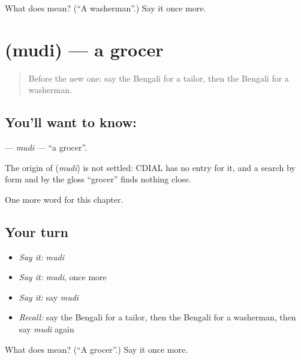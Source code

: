 \begin{tcolorbox}[breakable,colback=teal!4,colframe=teal!35!black,title={Before you move on}]
What does  mean? (\textquotedblleft{}A washerman\textquotedblright{}.) Say it once more.
\end{tcolorbox}
\section[\texorpdfstring{\bn{মুদি} (mudi)}{মুদি (mudi)}]{ (mudi) — a grocer}

\label{lesson:BN-C126-mudi}



\begin{quote}
Before the new one: say the Bengali for a tailor, then the Bengali for a washerman.
\end{quote}

\subsection*{You'll want to know: }
\textbf{} — \emph{mudi} — \textquotedblleft{}a grocer\textquotedblright{}.

\begin{cousinweb}
The origin of \textbf{} (\emph{mudi}) is not settled: CDIAL has no entry for it, and a search by form and by the gloss \textquotedblleft{}grocer\textquotedblright{} finds nothing close.
\end{cousinweb}

\begin{grammarlens}[title={What you've built}]
One more word for this chapter.
\end{grammarlens}

\subsection*{Your turn}
\begin{itemize}
\raggedright
  \item \emph{Say it:} \emph{mudi}
  \item \emph{Say it:} \emph{mudi}, once more
  \item \emph{Say it:} say \emph{mudi}
  \item \emph{Recall:} say the Bengali for a tailor, then the Bengali for a washerman, then say \emph{mudi} again
\end{itemize}

\begin{tcolorbox}[breakable,colback=teal!4,colframe=teal!35!black,title={Before you move on}]
What does  mean? (\textquotedblleft{}A grocer\textquotedblright{}.) Say it once more.
\end{tcolorbox}
